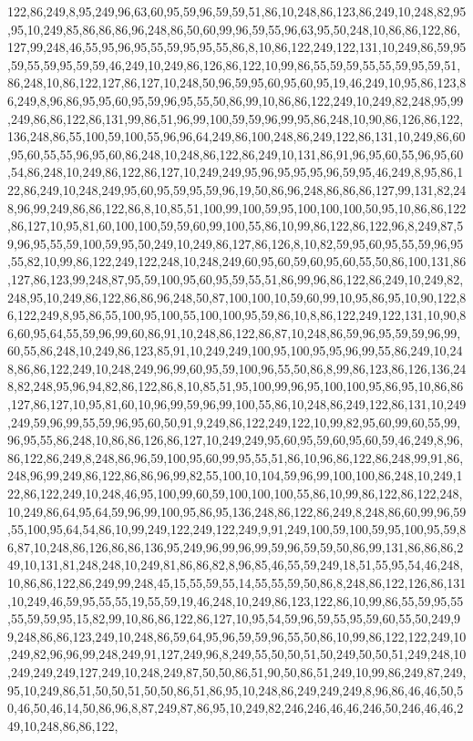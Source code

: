 122,86,249,8,95,249,96,63,60,95,59,96,59,59,51,86,10,248,86,123,86,249,10,248,82,95,95,10,249,85,86,86,86,96,248,86,50,60,99,96,59,55,96,63,95,50,248,10,86,86,122,86,127,99,248,46,55,95,96,95,55,59,95,95,55,86,8,10,86,122,249,122,131,10,249,86,59,95,59,55,59,95,59,59,46,249,10,249,86,126,86,122,10,99,86,55,59,59,55,55,59,95,59,51,86,248,10,86,122,127,86,127,10,248,50,96,59,95,60,95,60,95,19,46,249,10,95,86,123,86,249,8,96,86,95,95,60,95,59,96,95,55,50,86,99,10,86,86,122,249,10,249,82,248,95,99,249,86,86,122,86,131,99,86,51,96,99,100,59,59,96,99,95,86,248,10,90,86,126,86,122,136,248,86,55,100,59,100,55,96,96,64,249,86,100,248,86,249,122,86,131,10,249,86,60,95,60,55,55,96,95,60,86,248,10,248,86,122,86,249,10,131,86,91,96,95,60,55,96,95,60,54,86,248,10,249,86,122,86,127,10,249,249,95,96,95,95,95,96,59,95,46,249,8,95,86,122,86,249,10,248,249,95,60,95,59,95,59,96,19,50,86,96,248,86,86,86,127,99,131,82,248,96,99,249,86,86,122,86,8,10,85,51,100,99,100,59,95,100,100,100,50,95,10,86,86,122,86,127,10,95,81,60,100,100,59,59,60,99,100,55,86,10,99,86,122,86,122,96,8,249,87,59,96,95,55,59,100,59,95,50,249,10,249,86,127,86,126,8,10,82,59,95,60,95,55,59,96,95,55,82,10,99,86,122,249,122,248,10,248,249,60,95,60,59,60,95,60,55,50,86,100,131,86,127,86,123,99,248,87,95,59,100,95,60,95,59,55,51,86,99,96,86,122,86,249,10,249,82,248,95,10,249,86,122,86,86,96,248,50,87,100,100,10,59,60,99,10,95,86,95,10,90,122,86,122,249,8,95,86,55,100,95,100,55,100,100,95,59,86,10,8,86,122,249,122,131,10,90,86,60,95,64,55,59,96,99,60,86,91,10,248,86,122,86,87,10,248,86,59,96,95,59,59,96,99,60,55,86,248,10,249,86,123,85,91,10,249,249,100,95,100,95,95,96,99,55,86,249,10,248,86,86,122,249,10,248,249,96,99,60,95,59,100,96,55,50,86,8,99,86,123,86,126,136,248,82,248,95,96,94,82,86,122,86,8,10,85,51,95,100,99,96,95,100,100,95,86,95,10,86,86,127,86,127,10,95,81,60,10,96,99,59,96,99,100,55,86,10,248,86,249,122,86,131,10,249,249,59,96,99,55,59,96,95,60,50,91,9,249,86,122,249,122,10,99,82,95,60,99,60,55,99,96,95,55,86,248,10,86,86,126,86,127,10,249,249,95,60,95,59,60,95,60,59,46,249,8,96,86,122,86,249,8,248,86,96,59,100,95,60,99,95,55,51,86,10,96,86,122,86,248,99,91,86,248,96,99,249,86,122,86,86,96,99,82,55,100,10,104,59,96,99,100,100,86,248,10,249,122,86,122,249,10,248,46,95,100,99,60,59,100,100,100,55,86,10,99,86,122,86,122,248,10,249,86,64,95,64,59,96,99,100,95,86,95,136,248,86,122,86,249,8,248,86,60,99,96,59,55,100,95,64,54,86,10,99,249,122,249,122,249,9,91,249,100,59,100,59,95,100,95,59,86,87,10,248,86,126,86,86,136,95,249,96,99,96,99,59,96,59,59,50,86,99,131,86,86,86,249,10,131,81,248,248,10,249,81,86,86,82,8,96,85,46,55,59,249,18,51,55,95,54,46,248,10,86,86,122,86,249,99,248,45,15,55,59,55,14,55,55,59,50,86,8,248,86,122,126,86,131,10,249,46,59,95,55,55,19,55,59,19,46,248,10,249,86,123,122,86,10,99,86,55,59,95,55,55,59,59,95,15,82,99,10,86,86,122,86,127,10,95,54,59,96,59,55,95,59,60,55,50,249,99,248,86,86,123,249,10,248,86,59,64,95,96,59,59,96,55,50,86,10,99,86,122,122,249,10,249,82,96,96,99,248,249,91,127,249,96,8,249,55,50,50,51,50,249,50,50,51,249,248,10,249,249,249,127,249,10,248,249,87,50,50,86,51,90,50,86,51,249,10,99,86,249,87,249,95,10,249,86,51,50,50,51,50,50,86,51,86,95,10,248,86,249,249,249,8,96,86,46,46,50,50,46,50,46,14,50,86,96,8,87,249,87,86,95,10,249,82,246,246,46,46,246,50,246,46,46,249,10,248,86,86,122,